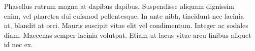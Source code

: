 Phasellus rutrum magna at dapibus dapibus. Suspendisse aliquam dignissim enim, vel pharetra dui euismod pellentesque. In ante nibh, tincidunt nec lacinia at, blandit at orci. Mauris suscipit vitae elit vel condimentum. Integer ac sodales diam. Maecenas semper lacinia volutpat. Etiam ut lacus vitae arcu finibus aliquet id nec ex.